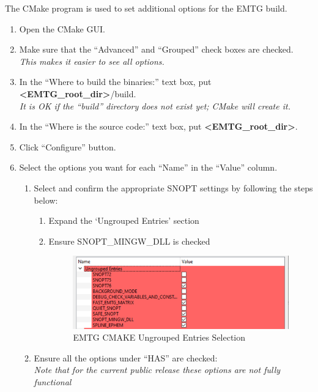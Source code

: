 
The CMake program is used to set additional options for the \ac{EMTG} build.

\begin{enumerate}
	\item Open the CMake \ac{GUI}.
	\item Make sure that the ``Advanced'' and ``Grouped'' check boxes are checked. \\ \emph{This makes it easier to see all options.}
	\item In the ``Where to build the binaries:'' text box, put \textbf{\textless EMTG\_root\_dir\textgreater}/build. \\ \emph{It is OK if the ``build'' directory does not exist yet; CMake will create it.}
	\item In the ``Where is the source code:'' text box, put \textbf{\textless EMTG\_root\_dir\textgreater}.
	\item Click ``Configure'' button.
	\item Select the options you want for each ``Name'' in the ``Value'' column. 
	\begin{enumerate}
		\item Select and confirm the appropriate SNOPT settings by following the steps below:
		\begin{enumerate}
			\item Expand the ‘Ungrouped Entries’ section
			\item Ensure SNOPT\_MINGW\_DLL is checked 
				\begin{figure}[H]
					\centering
					\includegraphics[width=0.7\linewidth]{../../../shared_latex_inputs/images/emtg_cmake_ungrouped-options.png}
					\caption{EMTG CMAKE Ungrouped Entries Selection}
				\end{figure}
		\end{enumerate}
		\item Ensure all the options under ``HAS'' are checked: \\ \emph{Note that for the current public release these options are not fully functional}
		\begin{enumerate}

\end{enumerate}
\end{enumerate}
\end{enumerate}
